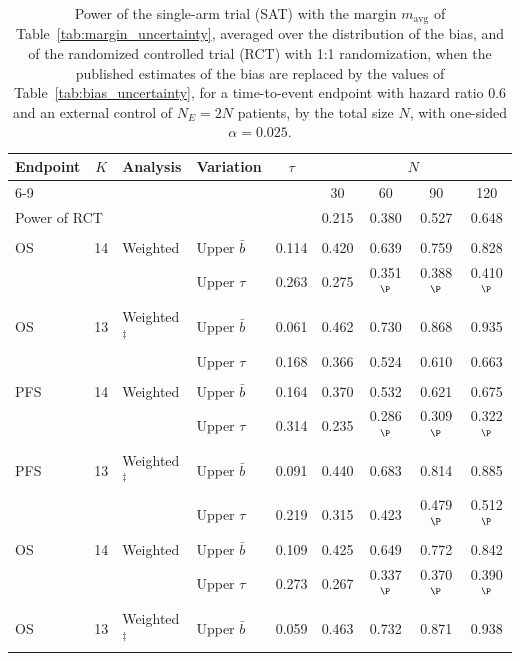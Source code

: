 \begin{table}[!htb]
\centering
\small
\setlength{\tabcolsep}{3pt}
\caption{Power of the single-arm trial (SAT) with the margin $m_{\mathrm{avg}}$ of Table~\ref{tab:margin_uncertainty}, averaged over the distribution of the bias, and of the randomized controlled trial (RCT) with 1:1 randomization, when the published estimates of the bias are replaced by the values of Table~\ref{tab:bias_uncertainty}, for a time-to-event endpoint with hazard ratio 0.6 and an external control of $N_E = 2N$ patients, by the total size $N$, with one-sided $\alpha = 0.025$.}
\label{tab:power_uncertainty}
\begin{tabular}{lcllccccc}
\toprule
Endpoint & $K$ & Analysis & Variation & $\tau$ & \multicolumn{4}{c}{$N$} \\
\cmidrule(lr){6-9}
 & & & & & 30 & 60 & 90 & 120 \\
\midrule
\multicolumn{5}{l}{Power of RCT} & 0.215 & 0.380 & 0.527 & 0.648 \\
\addlinespace
\multicolumn{9}{l}{Incerti et al.~\cite{Incerti2023}} \\
OS & 14 & Weighted & Upper $\bar{b}$ & 0.114 & 0.420 & 0.639 & 0.759 & 0.828 \\
 &  &  & Upper $\tau$ & 0.263 & 0.275 & 0.351$^{\P}$ & 0.388$^{\P}$ & 0.410$^{\P}$ \\
OS & 13 & Weighted$^{\ddagger}$ & Upper $\bar{b}$ & 0.061 & 0.462 & 0.730 & 0.868 & 0.935 \\
 &  &  & Upper $\tau$ & 0.168 & 0.366 & 0.524 & 0.610 & 0.663 \\
\addlinespace
\multicolumn{9}{l}{Bahmane et al.~\cite{Bahmane2025}} \\
PFS & 14 & Weighted & Upper $\bar{b}$ & 0.164 & 0.370 & 0.532 & 0.621 & 0.675 \\
 &  &  & Upper $\tau$ & 0.314 & 0.235 & 0.286$^{\P}$ & 0.309$^{\P}$ & 0.322$^{\P}$ \\
PFS & 13 & Weighted$^{\ddagger}$ & Upper $\bar{b}$ & 0.091 & 0.440 & 0.683 & 0.814 & 0.885 \\
 &  &  & Upper $\tau$ & 0.219 & 0.315 & 0.423 & 0.479$^{\P}$ & 0.512$^{\P}$ \\
OS & 14 & Weighted & Upper $\bar{b}$ & 0.109 & 0.425 & 0.649 & 0.772 & 0.842 \\
 &  &  & Upper $\tau$ & 0.273 & 0.267 & 0.337$^{\P}$ & 0.370$^{\P}$ & 0.390$^{\P}$ \\
OS & 13 & Weighted$^{\ddagger}$ & Upper $\bar{b}$ & 0.059 & 0.463 & 0.732 & 0.871 & 0.938 \\

\end{tabular}
\end{table}
